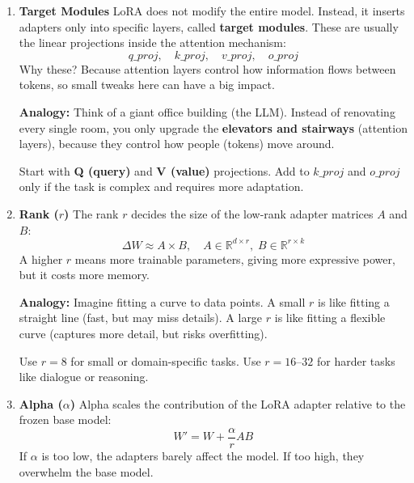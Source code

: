 \begin{enumerate}
    \item \textbf{Target Modules}  
    LoRA does not modify the entire model. Instead, it inserts adapters only into specific layers, called \textbf{target modules}.  
    These are usually the linear projections inside the attention mechanism:
    \[
    q\_proj, \quad k\_proj, \quad v\_proj, \quad o\_proj
    \]
    Why these? Because attention layers control how information flows between tokens, so small tweaks here can have a big impact.  

    \textbf{Analogy:}  
Think of a giant office building (the LLM). Instead of renovating every single room, you only upgrade the \textbf{elevators and stairways} (attention layers), because they control how people (tokens) move around.  


    \begin{tcolorbox}[colback=blue!5,colframe=blue!70!black,title=Rule of Thumb]
        Start with \textbf{Q (query)} and \textbf{V (value)} projections.  
        Add to $k\_proj$ and $o\_proj$ only if the task is complex and requires more adaptation.
    \end{tcolorbox}

    \item \textbf{Rank ($r$)}  
    The rank $r$ decides the size of the low-rank adapter matrices $A$ and $B$:
    \[
    \Delta W \approx A \times B, \quad A \in \mathbb{R}^{d \times r}, \; B \in \mathbb{R}^{r \times k}
    \]
    A higher $r$ means more trainable parameters, giving more expressive power, but it costs more memory.  

    \textbf{Analogy:} Imagine fitting a curve to data points. A small $r$ is like fitting a straight line (fast, but may miss details). A large $r$ is like fitting a flexible curve (captures more detail, but risks overfitting).   

    \begin{tcolorbox}[colback=green!5,colframe=green!60!black,title=Rule of Thumb]
        Use $r=8$ for small or domain-specific tasks.  
        Use $r=16$–$32$ for harder tasks like dialogue or reasoning.
    \end{tcolorbox}

    \item \textbf{Alpha ($\alpha$)}  
    Alpha scales the contribution of the LoRA adapter relative to the frozen base model:
    \[
    W' = W + \frac{\alpha}{r} A B
    \]
    If $\alpha$ is too low, the adapters barely affect the model. If too high, they overwhelm the base model.  


\end{enumerate}
